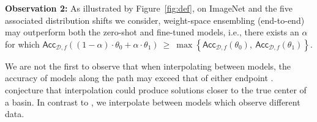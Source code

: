 \textbf{Observation 2:} As illustrated by Figure~\ref{fig:def}, on ImageNet and the five associated distribution shifts we consider, weight-space ensembling (end-to-end) may outperform both the zero-shot and fine-tuned models, i.e., there exists an $\alpha$ for which $\mathsf{Acc}_{\mathcal{D}, f}\left((1-\alpha) \cdot \theta_0 +  \alpha \cdot \theta_1\right) \ \geq \ \max\left\{  \mathsf{Acc}_{\mathcal{D}, f}\left(\theta_0\right) ,  \ \mathsf{Acc}_{\mathcal{D}, f}\left(\theta_1\right) \right\}$.

We are not the first to observe that when interpolating between models, the accuracy of models along the path may exceed that of either endpoint \cite{izmailov2018averaging, neyshabur2020being, pmlr-v139-wortsman21a}. \citet{neyshabur2020being}
conjecture that interpolation could produce solutions closer to the true center of a basin. 
In contrast to \citet{neyshabur2020being}, we interpolate between models which observe different data.










